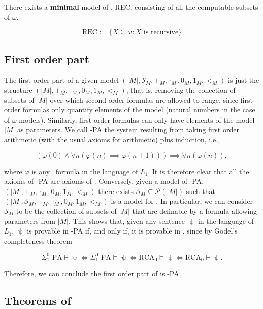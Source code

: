\documentclass[../main.tex]{memoir}
\begin{document}
\begin{corollary}
  \label{corollary:rec-model}
  There exists a \textbf{minimal} model of \rca, REC, consisting of all the computable subsets of $\omega$.

  \[ \text{REC} := \{X \subseteq \omega: X \text{ is recursive}\} \]
\end{corollary}

\subsection{First order part}

The first order part of a given model $(|M|, \mathcal{S}_M, +_M, \cdot_M, 0_M, 1_M, <_M)$ is just the structure $(|M|, +_M, \cdot_M, 0_M, 1_M, <_M)$, that is, removing the collection of subsets of $|M|$ over which second order formulas are allowed to range, since first order formulas only quantify elements of the model (natural numbers in the case of $\omega$-models). Similarly, first order formulas can only have elements of the model $|M|$ as parameters. We call \re-PA the system resulting from taking first order arithmetic (with the usual axioms for arithmetic) plus \re induction, i.e.,

\[ (\varphi(0) \land \forall n (\varphi(n) \implies \varphi(n + 1))) \implies \forall n (\varphi(n)), \]

where $\varphi$ is any \re\ formula in the language of $L_1$. It is therefore clear that all the axioms of \re-PA are axioms of \rca. Conversely, given a model of \re-PA, $(|M|, +_M, \cdot_M, 0_M, 1_M, <_M)$ there exists $\mathcal{S}_M \subseteq \mathcal{P}(|M|)$ such that $(|M|, \mathcal{S}_M, +_M, \cdot_M, 0_M, 1_M, <_M)$ is a model for \rca. In particular, we can consider $\mathcal{S}_M$ to be the collection of subsets of $|M|$ that are definable by a \rec formula allowing parameters from $|M|$. This shows that, given any sentence $\uppsi$ in the language of $L_1$, $\uppsi$ is provable in \re-PA if, and only if, it is provable in \rca, since by Gödel's completeness theorem

\[ \Sigma_1^0\text{-PA} \vdash \uppsi \iff \Sigma_1^0\text{-PA} \vDash \uppsi \iff \text{RCA}_0 \vDash \uppsi \iff \text{RCA}_0 \vdash \uppsi. \]

Therefore, we can conclude the first order part of \rca is \re-PA.

\subsection{Theorems of \rca}
\end{document}
